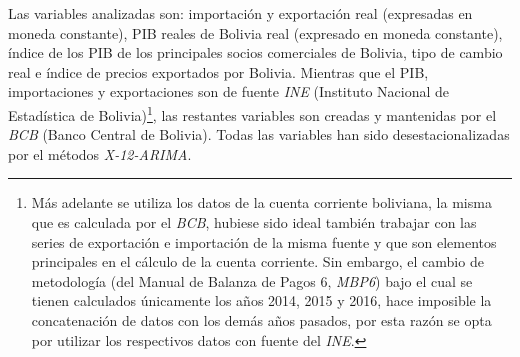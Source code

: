 \documentclass[12pt,letterpaper]{article}
\begin{document}
Las variables analizadas son: importación y exportación real (expresadas en moneda constante), PIB reales de Bolivia real (expresado en moneda constante), índice de los PIB de los principales socios comerciales de Bolivia, tipo de cambio real e índice de precios exportados por Bolivia. Mientras que el PIB, importaciones y exportaciones son de fuente \emph{INE} (Instituto Nacional de Estadística de Bolivia)\footnote{Más adelante se utiliza los datos de la cuenta corriente boliviana, la misma que es calculada por el \emph{BCB}, hubiese sido ideal también trabajar con las series de exportación e importación de la misma fuente y que son elementos principales en el cálculo de la cuenta corriente. Sin embargo, el cambio de metodología (del Manual de Balanza de Pagos 6, \emph{MBP6}) bajo el cual se tienen calculados únicamente los años 2014, 2015 y 2016, hace imposible la concatenación de datos con los demás años pasados, por esta razón se opta por utilizar los respectivos datos con fuente del \emph{INE}.}, las restantes variables son creadas y mantenidas por el \emph{BCB} (Banco Central de Bolivia). Todas las variables han sido desestacionalizadas por el métodos \emph{X-12-ARIMA}.
\end{document}
